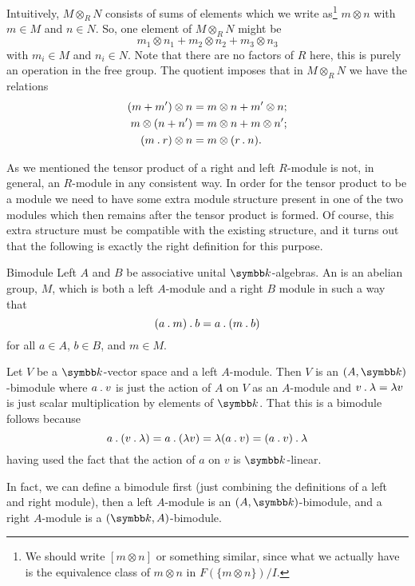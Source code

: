 Intuitively, \(M \otimes_R N\) consists of sums of elements which we write as\footnote{We should write \([m \otimes n]\) or something similar, since what we actually have is the equivalence class of \(m \otimes n\) in \(F(\{m \otimes n\})/I\).} \(m \otimes n\) with \(m \in M\) and \(n \in N\).
So, one element of \(M \otimes_R N\) might be
\begin{equation}
    m_1 \otimes n_1 + m_2 \otimes n_2 + m_3 \otimes n_3
\end{equation}
with \(m_i \in M\) and \(n_i \in N\).
Note that there are no factors of \(R\) here, this is purely an operation in the free group.
The quotient imposes that in \(M \otimes_R N\) we have the relations
\begin{align}
    (m + m') \otimes n &= m \otimes n + m' \otimes n;\\
    m \otimes (n + n') &= m \otimes n + m \otimes n';\\
    (m \mathbin{.} r) \otimes n &= m \otimes (r \mathbin{.} n).
\end{align}

As we mentioned the tensor product of a right and left \(R\)-module is not, in general, an \(R\)-module in any consistent way.
In order for the tensor product to be a module we need to have some extra module structure present in one of the two modules which then remains after the tensor product is formed.
Of course, this extra structure must be compatible with the existing structure, and it turns out that the following is exactly the right definition for this purpose.

\begin{dfn}{Bimodule}{}
    Left \(A\) and \(B\) be associative unital \(\field\)-algebras.
    An  is an abelian group, \(M\), which is both a left \(A\)-module and a right \(B\) module in such a way that
    \begin{equation}
        (a \mathbin{.} m) \mathbin{.} b = a \mathbin{.} (m \mathbin{.} b)
    \end{equation}
    for all \(a \in A\), \(b \in B\), and \(m \in M\).
\end{dfn}

\begin{exm}{}{}
    Let \(V\) be a \(\field\)-vector space and a left \(A\)-module.
    Then \(V\) is an \((A, \field)\)-bimodule where \(a \mathbin{.} v\) is just the action of \(A\) on \(V\) as an \(A\)-module and \(v \mathbin{.} \lambda = \lambda v\) is just scalar multiplication by elements of \(\field\).
    That this is a bimodule follows because
    \begin{equation}
        a \mathbin{.} (v \mathbin{.} \lambda) = a \mathbin{.} (\lambda v) = \lambda (a \mathbin{.} v) = (a \mathbin{.} v) \mathbin{.} \lambda
    \end{equation}
    having used the fact that the action of \(a\) on \(v\) is \(\field\)-linear.
    
    In fact, we can define a bimodule first (just combining the definitions of a left and right module), then a left \(A\)-module is an \((A, \field)\)-bimodule, and a right \(A\)-module is a \((\field, A)\)-bimodule.
\end{exm}


